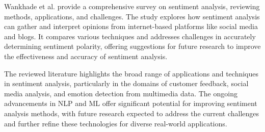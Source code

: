 Wankhade et al.\cite{Wankhade2022} provide a comprehensive survey on sentiment analysis, reviewing methods, applications, and challenges. The study explores how sentiment analysis can gather and interpret opinions from internet-based platforms like social media and blogs. It compares various techniques and addresses challenges in accurately determining sentiment polarity, offering suggestions for future research to improve the effectiveness and accuracy of sentiment analysis.

  
The reviewed literature highlights the broad range of applications and techniques in sentiment analysis, particularly in the domains of customer feedback, social media analysis, and emotion detection from multimedia data. The ongoing advancements in NLP and ML offer significant potential for improving sentiment analysis methods, with future research expected to address the current challenges and further refine these technologies for diverse real-world applications.
